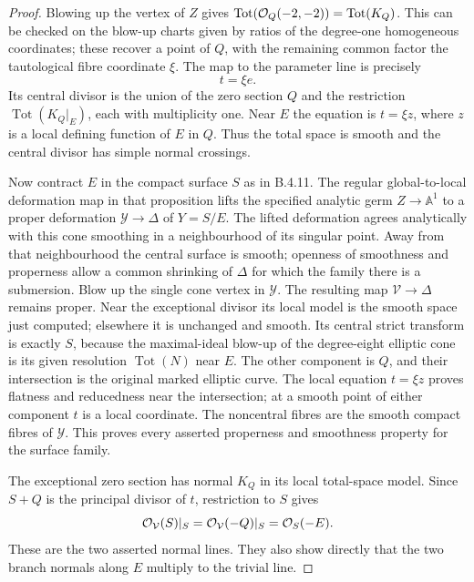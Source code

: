 \begin{proof}
Blowing up the vertex of $Z$ gives
$\operatorname{Tot}(\mathcal O_Q(-2,-2))=\operatorname{Tot}(K_Q)$.
This can be checked on the blow-up charts given by ratios of the
degree-one homogeneous coordinates; these recover a point of
$Q$, with the remaining common factor the tautological fibre
coordinate $\xi$.
The map to the parameter line is precisely
\[
 t=\xi e.
\]
Its central divisor is the union of the zero section $Q$ and
the restriction $\operatorname{Tot}(K_Q|_E)$, each with
multiplicity one.  Near $E$ the equation is $t=\xi z$, where
$z$ is a local defining function of $E$ in $Q$.
Thus the total space is smooth and the central divisor has
simple normal crossings.

Now contract $E$ in the compact surface $S$ as in B.4.11.
The regular global-to-local deformation map in that proposition
lifts the specified analytic germ $Z\to\mathbb A^1$ to a proper
deformation $\mathcal Y\to\Delta$ of $Y=S/E$.
The lifted deformation agrees analytically with this cone
smoothing in a neighbourhood of its singular point.
Away from that neighbourhood the central surface is smooth;
openness of smoothness and properness allow a common shrinking
of $\Delta$ for which the family there is a submersion.
Blow up the single cone vertex in $\mathcal Y$.
The resulting map $\mathcal V\to\Delta$ remains proper.
Near the exceptional divisor its local model is the smooth
space just computed; elsewhere it is unchanged and smooth.
Its central strict transform is exactly $S$, because the
maximal-ideal blow-up of the degree-eight elliptic cone is its
given resolution $\operatorname{Tot}(N)$ near $E$.
The other component is $Q$, and their intersection is the original
marked elliptic curve.  The local equation $t=\xi z$ proves
flatness and reducedness near the intersection; at a smooth
point of either component $t$ is a local coordinate.
The noncentral fibres are the smooth compact fibres of
$\mathcal Y$.
This proves every asserted properness and smoothness property
for the surface family.

The exceptional zero section has normal $K_Q$ in its local
total-space model.  Since $S+Q$ is the principal divisor of $t$,
restriction to $S$ gives
\[
 \mathcal O_{\mathcal V}(S)|_S
   =\mathcal O_{\mathcal V}(-Q)|_S=\mathcal O_S(-E).
\]
These are the two asserted normal lines.  They also show directly
that the two branch normals along $E$ multiply to the trivial line.


\end{proof}
